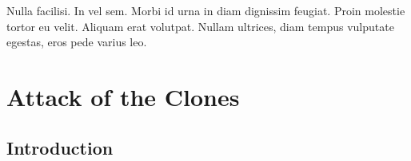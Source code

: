 \graphicspath{{figures/chapter-3/}}


\begin{savequote}[75mm]
Nulla facilisi. In vel sem. Morbi id urna in diam dignissim feugiat. Proin molestie tortor eu velit. Aliquam erat volutpat. Nullam    ultrices, diam tempus vulputate egestas, eros pede varius leo.
\end{savequote}

\chapter{Attack of the Clones}


\section{Introduction}

\lipsum[7-10]
\cite{Lucas2}



